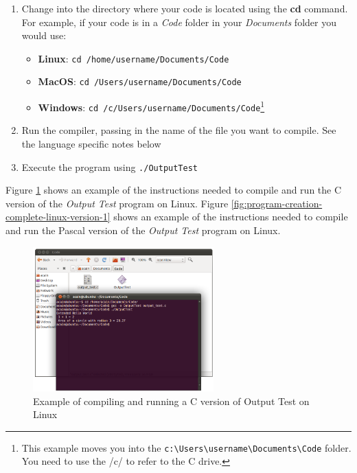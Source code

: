 \begin{enumerate}
  \item Change into the directory where your code is located using the \textbf{cd} command. For example, if your code is in a \emph{Code} folder in your \emph{Documents} folder you would use:
  \begin{itemize}
    \item \textbf{Linux}: \texttt{cd /home/username/Documents/Code}
    \item \textbf{MacOS}: \texttt{cd /Users/username/Documents/Code}
    \item \textbf{Windows}: \texttt{cd /c/Users/username/Documents/Code}\footnote{This example moves you into the \texttt{c:{\textbackslash}Users{\textbackslash}username{\textbackslash}Documents{\textbackslash}Code} folder. You need to use the /c/ to refer to the C drive. }
  \end{itemize} 
  \item Run the compiler, passing in the name of the file you want to compile. See the language specific notes below
  \item Execute the program using \texttt{./OutputTest}
\end{enumerate}



\clearpage
Figure \ref{fig:program-creation-complete-linux-version} shows an example of the instructions needed to compile and run the C version of the \emph{Output Test} program on Linux. Figure \ref{fig:program-creation-complete-linux-version-1} shows an example of the instructions needed to compile and run the Pascal version of the \emph{Output Test} program on Linux.

\begin{figure}[h]
   \centering
   \includegraphics[width=0.62\textwidth]{./topics/program-creation/images/LinuxCompleteExample1} 
   \caption{Example of compiling and running a C version of Output Test on Linux}
   \label{fig:program-creation-complete-linux-version}
\end{figure}

